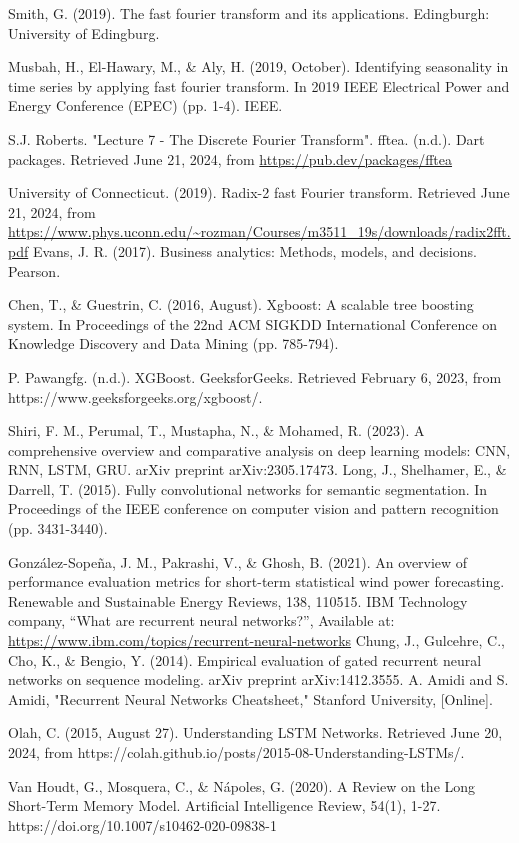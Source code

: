 \documentclass{ieeeojies}
\begin{document}
\begin{thebibliography}{00}
Smith, G. (2019). The fast fourier transform and its applications. Edingburgh: University of Edingburg.




Musbah, H., El-Hawary, M., \& Aly, H. (2019, October). Identifying seasonality in time series by applying fast fourier transform. In 2019 IEEE Electrical Power and Energy Conference (EPEC) (pp. 1-4). IEEE.

S.J. Roberts. "Lecture 7 - The Discrete Fourier Transform".
fftea. (n.d.). Dart packages. Retrieved June 21, 2024, from \url{https://pub.dev/packages/fftea}

University of Connecticut. (2019). Radix-2 fast Fourier transform. Retrieved June 21, 2024, from \url{https://www.phys.uconn.edu/~rozman/Courses/m3511_19s/downloads/radix2fft.pdf}
Evans, J. R. (2017). Business analytics: Methods, models, and decisions. Pearson.

Chen, T., \& Guestrin, C. (2016, August). Xgboost: A scalable tree boosting system. In Proceedings of the 22nd ACM SIGKDD International Conference on Knowledge Discovery and Data Mining (pp. 785-794).

P. Pawangfg. (n.d.). XGBoost. GeeksforGeeks. Retrieved February 6, 2023, from https://www.geeksforgeeks.org/xgboost/.

Shiri, F. M., Perumal, T., Mustapha, N., \& Mohamed, R. (2023). A comprehensive overview and comparative analysis on deep learning models: CNN, RNN, LSTM, GRU. arXiv preprint arXiv:2305.17473.
Long, J., Shelhamer, E., \& Darrell, T. (2015). Fully convolutional networks for semantic segmentation. In Proceedings of the IEEE conference on computer vision and pattern recognition (pp. 3431-3440).

González-Sopeña, J. M., Pakrashi, V., \& Ghosh, B. (2021). An overview of performance evaluation metrics for short-term statistical wind power forecasting. Renewable and Sustainable Energy Reviews, 138, 110515.
IBM Technology company, “What are recurrent neural networks?”, Available at: \url{https://www.ibm.com/topics/recurrent-neural-networks}
Chung, J., Gulcehre, C., Cho, K., \& Bengio, Y. (2014). Empirical evaluation of gated recurrent neural networks on sequence modeling. arXiv preprint arXiv:1412.3555.
A. Amidi and S. Amidi, "Recurrent Neural Networks Cheatsheet," Stanford University, [Online].

Olah, C. (2015, August 27). Understanding LSTM Networks. Retrieved June 20, 2024, from https://colah.github.io/posts/2015-08-Understanding-LSTMs/.

Van Houdt, G., Mosquera, C., & Nápoles, G. (2020). A Review on the Long Short-Term Memory Model. Artificial Intelligence Review, 54(1), 1-27. https://doi.org/10.1007/s10462-020-09838-1



\end{thebibliography}






\EOD
\end{document}
